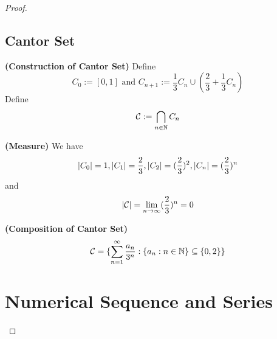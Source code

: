 \documentclass{report}
\begin{document}
\begin{proof}
\section{Cantor Set}
\begin{definition}
\textbf{(Construction of Cantor Set)} Define 
\begin{equation}
C_0:=[0,1]\text{ and }C_{n+1}:=\frac{1}{3}C_n\cup (\frac{2}{3}+\frac{1}{3}C_n)
\end{equation}
Define
\begin{equation}
\mathcal{C}:=\bigcap_{n\in\mathbb{N}}C_n
\end{equation}
\end{definition}
\begin{theorem}
\textbf{(Measure)} We have
\begin{equation}
\left|C_0\right|=1,\left|C_1\right|=\frac{2}{3},\left|C_2\right|=(\frac{2}{3})^2, \left|C_n\right|=(\frac{2}{3})^n
\end{equation}
and 
\begin{equation}
\left|\mathcal{C}\right|=\lim_{n\to\infty}(\frac{2}{3})^n=0
\end{equation}
\end{theorem}
\begin{theorem}
\textbf{(Composition of Cantor Set)}
\begin{equation}
\mathcal{C}=\{ \sum_{n=1}^\infty   \frac{a_n}{3^n}: \{ a_n:n\in\mathbb{N} \}\subseteq \{ 0,2 \} \}
\end{equation}
\end{theorem}

\chapter{Numerical Sequence and Series}

\end{proof}
\end{document}
